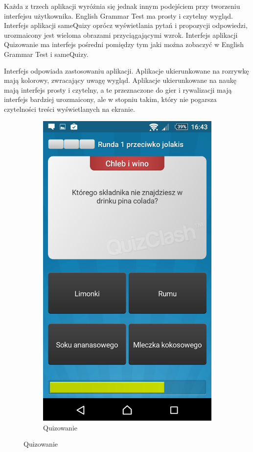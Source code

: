\documentclass[eng]{mgr}
\begin{document}
		Każda z trzech aplikacji wyróżnia się jednak innym podejściem przy tworzeniu interfejsu użytkownika. English Grammar Test ma prosty i czytelny wygląd. Interfejs aplikacji sameQuizy oprócz wyświetlania pytań i propozycji odpowiedzi, urozmaicony jest wieloma obrazami przyciągającymi wzrok. Interfejs aplikacji Quizowanie ma interfejs pośredni pomiędzy tym jaki można zobaczyć w English Grammar Test i sameQuizy.
		
		Interfejs odpowiada zastosowaniu aplikacji. Aplikacje ukierunkowane na rozrywkę mają kolorowy, zwracający uwagę wygląd. Aplikacje ukierunkowane na naukę mają interfejs prosty i czytelny, a te przeznaczone do gier i rywalizacji mają interfejs bardziej urozmaicony, ale w stopniu takim, który nie pogarsza czytelności treści wyświetlanych na ekranie.
		
		\begin{figure}[ht]
			\centering
			\begin{subfigure}{.3\textwidth}
				\centering
				\includegraphics[width=.7\linewidth]{Quizowanie.png}
				\caption{Quizowanie}
				\label{fig:quizowanie}

\end{subfigure}
\end{figure}
\end{document}
